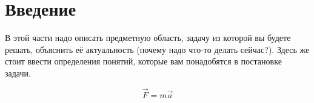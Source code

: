 \section{Введение}
\label{sec:Chapter0} 

В этой части надо описать предметную область, задачу из которой вы будете
решать, объяснить её актуальность (почему надо что-то делать сейчас?). Здесь же
стоит ввести определения понятий, которые вам понадобятся в постановке задачи.

\begin{equation}
    \vec{F} = m \vec{a}
\end{equation}

\newpage
